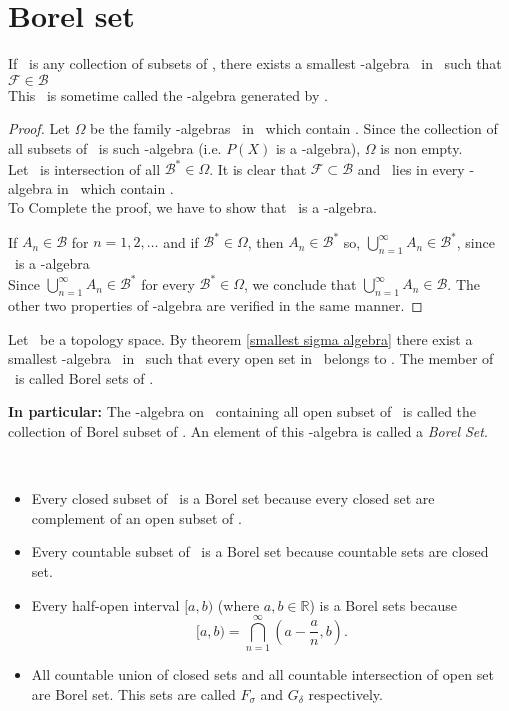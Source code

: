 \section{Borel set}
\begin{theorem}
    \label{smallest sigma algebra}
    If \F\ is any collection of subsets of \XX, there exists a smallest \sig-algebra \B\ in \XX\ such that $\mathcal{F}\in\mathcal{B}$\\
    This \B\ is sometime called the \sig-algebra generated by \F.
\end{theorem}
\begin{proof}
    Let $\Omega$ be the family \sig-algebras \BS\ in \XX\ which contain \F. Since the collection of all subsets of \XX\ is such \sig-algebra (i.e. $P(X)$ is a \sig-algebra), $\Omega$ is non empty.\\
    Let \B\ is  intersection of all $\mathcal{B}^*\in\Omega$. It is clear that $\mathcal{F}\subset\mathcal{B}$ and \B\ lies in every \sig-algebra in \XX\ which contain \F.\\
    To Complete the proof, we have to show that \B\ is a \sig-algebra.
    
    If $A_n\in\mathcal{B}$ for $n=1,2,\ldots$ and if $\mathcal{B}^*\in \Omega$, then $A_n\in\mathcal{B}^*$ so, $\bigcup_{n=1}^\infty A_n\in \mathcal{B}^*$,
    since \BS\ is a \sig-algebra\\
    Since $\bigcup_{n=1}^\infty A_n\in \mathcal{B}^*$ for every $\mathcal{B}^*\in \Omega$, we conclude that $\bigcup_{n=1}^\infty A_n\in \mathcal{B}$. The other two properties of \sig-algebra are verified in the same manner.
\end{proof}

\begin{definition}
    Let \XX\  be a topology space. By theorem \ref{smallest sigma algebra} there exist a smallest \sig-algebra \B\ in \XX\ such that every open set in \XX\ belongs to \B.  The member of \B\ is called Borel  sets of \XX.
\end{definition}

\textbf{In particular:} The \sig-algebra on \RR\ containing all open subset of \RR\ is called the collection of Borel subset of \RR. An element of this \sig-algebra is called a \textit{Borel Set}.

\begin{example}
    \
    \begin{itemize}
        \item Every closed subset of \RR\ is a Borel set because every closed set are complement of an open subset of \RR.
        \item Every countable subset of \RR\ is a Borel set because countable sets are closed set.
        \item Every half-open interval $[a,b)$ (where $a,b\in \mathds{R}$) is a Borel sets because 
        \[
        [a,b)=\bigcap_{n=1}^\infty\left(a-\frac{a}{n},b\right).
        \]
        \item All countable union of closed sets and all countable intersection of open set are Borel set. This sets are called $F_\sigma$ and $G_\delta$ respectively.
    \end{itemize}
\end{example}

